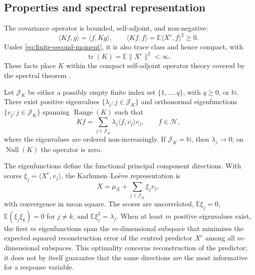 \subsection{Properties and spectral representation}

The covariance operator is bounded, self-adjoint, and non-negative:
\begin{equation}
    \langle Kf,g\rangle=\langle f,Kg\rangle,
    \qquad
    \langle Kf,f\rangle
    =\mathbb E\langle X^c,f\rangle^2\geq0.
    \label{eq:covariance-properties}
\end{equation}
Under \eqref{eq:finite-second-moment}, it is also trace class and hence compact, with
\begin{equation}
    \operatorname{tr}(K)=\mathbb E\|X^c\|^2<\infty.
    \label{eq:covariance-trace}
\end{equation}
These facts place $K$ within the compact self-adjoint operator theory covered by the spectral theorem \parencite{lin_mit_18102_2021,hsing_eubank_2015,horvath_kokoszka_2012}.

\begin{proposition}
Let $\mathcal J_K$ be either a possibly empty finite index set
$\{1,\ldots,q\}$, with $q\geq0$, or $\mathbb N$.  There exist positive eigenvalues
$\{\lambda_j:j\in\mathcal J_K\}$ and orthonormal eigenfunctions
$\{v_j:j\in\mathcal J_K\}$ spanning
$\overline{\operatorname{Range}(K)}$ such that
\begin{equation}
    Kf=\sum_{j\in\mathcal J_K}\lambda_j\langle f,v_j\rangle v_j,
    \qquad f\in\mathcal H,
    \label{eq:covariance-spectral-representation}
\end{equation}
where the eigenvalues are ordered non-increasingly.  If $\mathcal J_K=\mathbb N$,
then $\lambda_j\rightarrow0$; on $\operatorname{Null}(K)$ the operator is zero.
\end{proposition}

The eigenfunctions define the functional principal component directions. With scores $\xi_j=\langle X^c,v_j\rangle$, the Karhunen--Lo\`eve representation is
\begin{equation}
    X=\mu_X+\sum_{j\in\mathcal J_K}\xi_jv_j,
    \label{eq:karhunen-loeve}
\end{equation}
with convergence in mean square. The scores are uncorrelated, $\mathbb E\xi_j=0$, $\mathbb E(\xi_j\xi_k)=0$ for $j\neq k$, and $\mathbb E\xi_j^2=\lambda_j$. When at least $m$ positive eigenvalues exist, the first $m$ eigenfunctions span the $m$-dimensional subspace that minimises the expected squared reconstruction error of the centred predictor $X^c$ among all $m$-dimensional subspaces. This optimality concerns reconstruction of the predictor; it does not by itself guarantee that the same directions are the most informative for a response variable.

